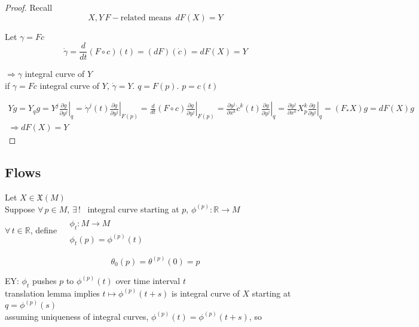 \documentclass[11pt]{amsart}
\theoremstyle{definition}
\begin{document}
\begin{proof}
Recall
\[
X,Y \, F-\text{related means } \, dF(X) =Y
\]

Let $\gamma = Fc$
\[
\dot{\gamma} = \frac{d}{dt} (F\circ c)(t) = (dF)(\dot{c}) = dF(X) = Y
\]

$\Longrightarrow \gamma $ integral curve of $Y$ \\

if $\gamma = Fc$ integral curve of $Y$, $\dot{\gamma} = Y$.  \quad $q = F(p)$.  $p=c(t)$

\[
\begin{gathered}
  Yg= Y_qg = Y^j \left. \frac{ \partial g}{ \partial y^j } \right|_q = \dot{\gamma}^j(t) \left. \frac{ \partial g}{ \partial y^j } \right|_{F(p)} = \frac{d}{dt} (F\circ c ) \left. \frac{ \partial g}{ \partial y^j } \right|_{F(p)} = \frac{ \partial y^j}{ \partial x^k } \dot{c}^k(t) \left. \frac{ \partial g}{ \partial y^j } \right|_q = \frac{ \partial y^j}{ \partial x^k} X^k_p \left. \frac{ \partial g}{ \partial y^j } \right|_q = (F_* X)g = dF(X)g \\
\Longrightarrow dF(X) = Y
\end{gathered}
\]
\end{proof}


\subsection*{Flows }


Let $X \in \mathfrak{X}(M)$ \\
Suppose $\forall \, p \in M$, $\exists \, !$ \, integral curve starting at $p$, $\phi^{(p)}: \mathbb{R} \to M$ \\
$\forall \, t \in \mathbb{R}$, define $\begin{aligned} & \quad \\
  & \phi_t: M \to M \\
  & \phi_t(p) = \phi^{(p)}(t) \end{aligned}$

\[
\theta_0(p) = \theta^{(p)}(0) = p
\]

EY: $\phi_t$ pushes $p$ to $\phi^{(p)}(t)$ over time interval $t$ \\

translation lemma implies $t\mapsto \phi^{(p)}(t+s)$ is integral curve of $X$ starting at $q = \phi^{(p)}(s)$  \\

assuming uniqueness of integral curves, $\phi^{(p)}(t) = \phi^{(p)}(t+s)$, so
\end{document}
